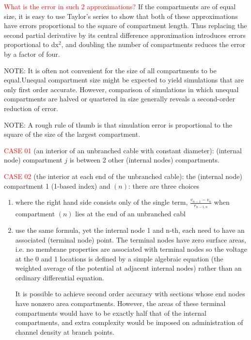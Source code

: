 \textcolor{red}{What is the error in such 2 approximations?}
If the compartments are of equal size, it is easy to use Taylor's series to
show that both of these approximations have errors proportional to the square of
compartment length. Thus replacing the second partial derivative by its central
difference approximation introduces errors proportional to dx$^2$, and doubling
the number of compartments reduces the error by a factor of four.

NOTE: It is often not convenient for the size of all compartments to be
equal.Unequal compartment size might be expected to yield simulations that are
only first order accurate.  However, comparison of simulations in which unequal
compartments are halved or quartered in size generally reveals a second-order
reduction of error. 

NOTE: A rough rule of thumb is that simulation error is proportional to the
square of the size of the largest compartment.

\textcolor{red}{CASE 01} (an interior of an unbranched cable with constant
diameter): (internal node) compartment $j$ is between 2 other (internal nodes)
compartments.

\textcolor{red}{CASE 02} (the interior at each end of the unbranched cable): the
(internal node) compartment 1 (1-based index) and $(n)$: there are three
choices
\begin{enumerate}
  \item  where the right hand side consists only of the single term, 
  $\frac{v_{n-1} -v_n}{r_{n-1,n}}$ when compartment $(n)$ lies at the end of
  an unbranched cabl

  \item use the same formula, yet the internal node 1 and n-th, each need to
have an associated (terminal node) point. The terminal nodes have zero surface
areas, i.e. no membrane properties are associated with terminal nodes so the
voltage at the 0 and 1 locations is defined by a simple algebraic equation (the
weighted average of the potential at adjacent internal nodes) rather than an
ordinary differential equation.

It is possible to achieve second order accuracy with sections whose end nodes
have nonzero area compartments. However, the areas of these terminal
compartments would have to be exactly half that of the internal compartments,
and extra complexity would be imposed on administration of channel density at
branch points.

\end{enumerate}

